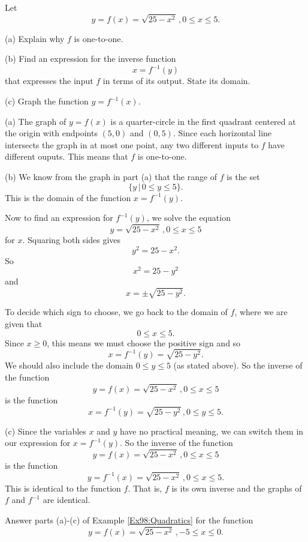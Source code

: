\documentclass{ximera}
\begin{document}
\begin{example} \label{Ex98:Quadratics}
Let 
\[
    y=   f(x) = \sqrt{25-x^2} \, , 0\leq x \leq 5 .
\]

(a) Explain why $f$ is one-to-one.

(b) Find an expression for the inverse function
\[
    x = f^{-1}(y)
\]
that expresses the input $f$ in terms of its output. State its domain.

(c) Graph the function $y=f^{-1}(x)$.


\begin{explanation}
(a) The graph of $y=f(x)$ is a quarter-circle in the first quadrant centered at the origin with endpoints $(5,0)$ and $(0,5)$. Since each horizontal line intersects the graph in at most one point, any two different inputs to $f$ have different ouputs. This means that $f$ is one-to-one.

(b) We know from the graph in part (a) that the range of $f$ is the set
\[
   \{ y \, | \,  0\leq y \leq 5 \} .
\]
This is the domain of the function $x=f^{-1}(y)$.

Now to find an expression for $f^{-1}(y)$, we solve the equation
\[
   y=   \sqrt{25-x^2} \, , 0\leq x \leq 5 
\]
for $x$. Squaring both sides gives
\[
   y^2 = 25 - x^2 .
\]
So 
\[
     x^2 = 25-y^2
\]
and 
\[
   x  = \pm \sqrt{25-y^2} .
\]

To decide which sign to choose, we go back to the domain of $f$, where we are given that 
\[
     0 \leq x \leq 5 .
\]
Since $x\geq 0$, this means we must choose the positive sign and so
\[
    x = f^{-1}(y) = \sqrt{25-y^2}.
\]
We should also include the domain $0\leq y \leq 5$ (as stated above). So the inverse of the function
\[
    y=   f(x) = \sqrt{25-x^2} \, , 0\leq x \leq 5 
\]
is the function
\[
    x = f^{-1}(y) = \sqrt{25-y^2} \, , 0\leq y \leq 5 .
\]

(c) Since the variables $x$ and $y$ have no practical meaning, we can switch them in our expression for $x = f^{-1}(y)$. So the inverse of the function
\[
    y=   f(x) = \sqrt{25-x^2} \, , 0\leq x \leq 5 
\]
is the function
\[
    y = f^{-1}(x) = \sqrt{25-x^2} \, , 0\leq x \leq 5 .
\]
This is identical to the function $f$. That is, $f$ is its own inverse and the graphs of $f$ and $f^{-1}$ are identical.

\end{explanation}

\end{example}

\begin{example}  \label{Ex97:Quadratics}
Answer parts (a)-(c) of Example \ref{Ex98:Quadratics} for the function
\[
    y=   f(x) = \sqrt{25-x^2} \, , -5 \leq x \leq 0 .
\]

\end{example}
\end{document}
